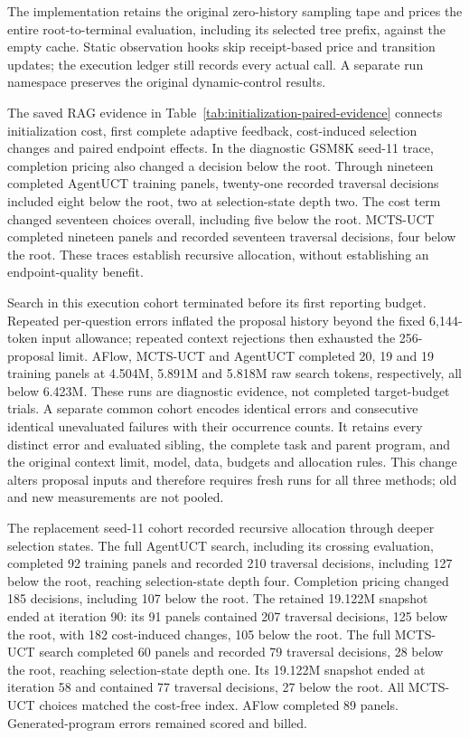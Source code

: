 The implementation retains the original zero-history sampling tape and
prices the entire root-to-terminal evaluation, including its selected tree
prefix, against the empty cache. Static observation hooks skip receipt-based
price and transition updates; the execution ledger still records every actual
call. A separate run namespace preserves the original dynamic-control results.

The saved RAG evidence in Table~\ref{tab:initialization-paired-evidence}
connects initialization cost, first complete adaptive feedback, cost-induced
selection changes and paired endpoint effects. In the diagnostic GSM8K
seed-11 trace, completion pricing also changed a decision below the root.
Through nineteen completed AgentUCT training panels, twenty-one recorded
traversal decisions included eight below the root, two at selection-state
depth two. The cost term changed seventeen choices overall, including five
below the root. MCTS-UCT completed nineteen panels and recorded seventeen
traversal decisions, four below the root. These traces establish recursive
allocation, without establishing an endpoint-quality benefit.

Search in this execution cohort terminated before its first reporting budget.
Repeated per-question errors inflated the proposal history beyond the fixed
6,144-token input allowance; repeated context rejections then exhausted the
256-proposal limit. AFlow, MCTS-UCT and AgentUCT completed 20, 19 and 19 training
panels at 4.504M, 5.891M and 5.818M raw search tokens, respectively, all below
6.423M. These runs are diagnostic evidence, not completed target-budget trials.
A separate common cohort encodes identical errors and consecutive identical
unevaluated failures with their occurrence counts. It retains every distinct
error and evaluated sibling, the complete task and parent program, and the
original context limit, model, data, budgets and allocation rules. This change
alters proposal inputs and therefore requires fresh runs for all three methods;
old and new measurements are not pooled.

The replacement seed-11 cohort recorded recursive allocation through deeper
selection states. The full AgentUCT search, including its crossing evaluation,
completed 92 training panels and recorded 210 traversal decisions, including
127 below the root, reaching selection-state depth four. Completion pricing
changed 185 decisions, including 107 below the root. The retained 19.122M
snapshot ended at iteration 90: its 91 panels contained 207 traversal
decisions, 125 below the root, with 182 cost-induced changes, 105 below the
root. The full MCTS-UCT search completed 60 panels and recorded 79 traversal
decisions, 28 below the root, reaching selection-state depth one. Its 19.122M
snapshot ended at iteration 58 and contained 77 traversal decisions,
27 below the root. All MCTS-UCT choices matched the cost-free index.
AFlow completed 89 panels. Generated-program errors remained scored and billed.


